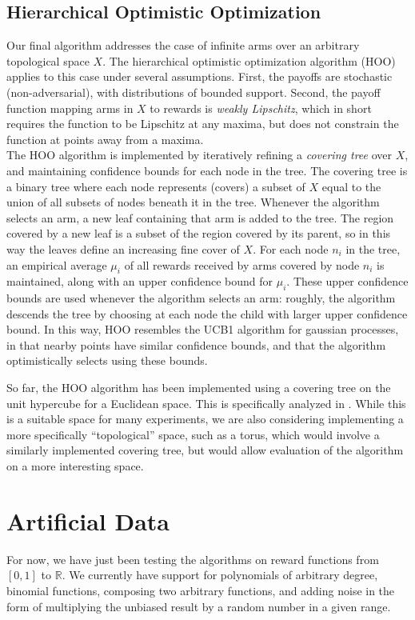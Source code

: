 \documentclass{article}
\begin{document}
\subsection{Hierarchical Optimistic Optimization}
Our final algorithm addresses the case of infinite arms over an
arbitrary topological space $X$. The hierarchical optimistic
optimization algorithm (HOO) applies to this case under several
assumptions. First, the payoffs are stochastic (non-adversarial), with
distributions of bounded support. Second, the payoff function mapping
arms in $X$ to rewards is \emph{weakly Lipschitz}, which in short requires
the function to be Lipschitz at any maxima, but does not constrain the
function at points away from a maxima.
\\
The HOO algorithm is implemented by iteratively refining a
\emph{covering tree} over $X$, and maintaining confidence bounds
for each node in the tree. The covering tree is a binary tree where
each node represents (covers) a subset of $X$ equal to the union of
all subsets of nodes beneath it in the tree. Whenever the algorithm
selects an arm, a new leaf containing that arm is added to the
tree. The region covered by a new leaf is a subset of the region
covered by its parent, so in this way the leaves define an increasing
fine cover of $X$. For each node $n_i$ in the tree, an empirical
average $\mu_i$ of all rewards received by arms covered by node $n_i$
is maintained, along with an upper confidence bound for
$\mu_i$. These upper confidence bounds are used whenever the algorithm
selects an arm: roughly, the algorithm descends the tree by choosing
at each node the child with larger upper confidence bound. In this
way, HOO resembles the UCB1 algorithm for gaussian processes, in that
nearby points have similar confidence bounds, and that the algorithm
optimistically selects using these bounds.

So far, the HOO algorithm has been implemented using a covering tree
on the unit hypercube for a Euclidean space. This is specifically
analyzed in \cite{xArmed}. While this is a suitable space for many
experiments, we are also considering implementing a more specifically
``topological'' space, such as a torus, which would involve a similarly
implemented covering tree, but would allow evaluation of the
algorithm on a more interesting space.
\\
\section{Artificial Data}
For now, we have just been testing the algorithms on reward functions from
$[0,1]$ to $\mathbb{R}$.  We currently have support for polynomials
of arbitrary degree, binomial functions, composing two arbitrary functions,
and adding noise in the form of multiplying the unbiased result by a random
number in a given range.
\end{document}

